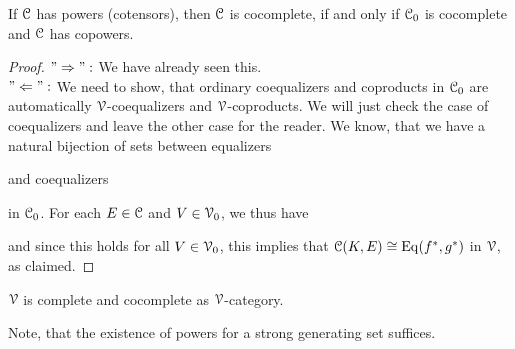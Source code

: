 \documentclass[a4paper,11pt,oneside,openany]{scrbook}
\begin{document}
\begin{prop}
   If $\operatorname{\mathcal{C}}$ has powers (cotensors), then $\operatorname{\mathcal{C}}$ is cocomplete, if and only if $\operatorname{\mathcal{C}}_{0}$ is cocomplete and $\operatorname{\mathcal{C}}$ has copowers.
\end{prop}

\begin{proof}
   $"\Rightarrow ":$ We have already seen this. \\
   $"\Leftarrow ":$ We need to show, that ordinary coequalizers and coproducts in $\operatorname{\mathcal{C}}_{0}$ are automatically $\operatorname{\mathcal{V}}$-coequalizers and $\operatorname{\mathcal{V}}$-coproducts. 
   We will just check the case of coequalizers and leave the other case for the reader. We know, that we have a natural bijection of sets between 
   equalizers 
      \begin{center}
      \end{center}
   and coequalizers 
      \begin{center}
      \end{center}
   in $\operatorname{\mathcal{C}}_{0}$. For each $E \in \operatorname{\mathcal{C}}$ and $V \in \operatorname{\mathcal{V}}_{0}$, we thus have 
      \begin{center}
      \end{center}
   and since this holds for all $V \in \operatorname{\mathcal{V}}_{0}$, this implies that $\operatorname{\mathcal{C}}(K,E) \cong \operatorname{Eq}(f^{\ast},g^{\ast})$ in $\operatorname{\mathcal{V}}$, as claimed.
\end{proof}

\begin{cor}
   $\operatorname{\mathcal{V}}$ is complete and cocomplete as $\operatorname{\mathcal{V}}$-category.
\end{cor}

\begin{rmk}
   Note, that the existence of powers for a strong generating set suffices. 
\end{rmk}
\end{document}
